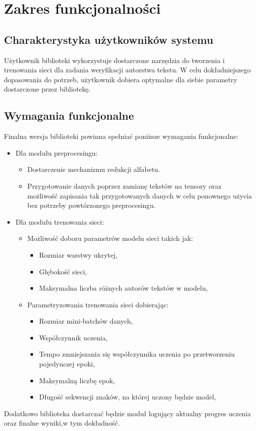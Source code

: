 \newpage
\section{Zakres funkcjonalności}

\subsection{Charakterystyka użytkowników systemu}
Użytkownik biblioteki wykorzystuje dostarczone narzędzia do tworzenia i trenowania sieci 
dla zadania weryfikacji autorstwa tekstu. W celu dokładniejszego dopasowania do potrzeb, 
użytkownik dobiera optymalne dla siebie parametry dostarczone przez bibliotekę.

 
\subsection{Wymagania funkcjonalne}
Finalna wersja biblioteki powinna spełniać poniższe wymagania funkcjonalne:
\begin{itemize}
 	\item Dla modułu preprocesingu:
	    \begin{itemize}
		    \item Dostarczenie mechanizmu redukcji alfabetu.
		    \item Przygotowanie danych poprzez zamianę tekstów na tensory oraz możliwość 
				zapisania tak przygotowanych danych w celu ponownego użycia bez potrzeby
				powtórzonego preprocesingu. 
	    \end{itemize}
 	\item Dla modułu trenowania sieci:
		\begin{itemize}
			\item Możliwość doboru parametrów modelu sieci takich jak:
				\begin{itemize}
			    	\item Rozmiar warstwy ukrytej,
			    	\item Głębokość sieci,
			    	\item Maksymalna liczba różnych autorów tekstów w modelu,
		    	\end{itemize}
			\item Parametryzowania trenowania sieci dobierając:
				\begin{itemize}
			    	\item Rozmiar mini-batchów danych,
			    	\item Współczynnik uczenia,
			    	\item Tempo zmniejszania się współczynnika uczenia po przetworzeniu pojedynczej epoki,
			    	\item Maksymalną liczbę epok,
			    	\item Długość sekwencji znaków, na której uczony będzie model,
		    	\end{itemize}
		  \end{itemize}
\end{itemize}
Dodatkowo biblioteka dostarczać będzie moduł logujący aktualny progres uczenia 
oraz finalne wyniki,w tym dokładność.	

